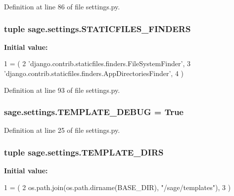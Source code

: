 Definition at line 86 of file settings.\+py.

\hypertarget{a00043_af629022b1da961fa9828f450bc80bd22}{}
\subsubsection[{S\+T\+A\+T\+I\+C\+F\+I\+L\+E\+S\+\_\+\+F\+I\+N\+D\+E\+R\+S}]{\setlength{\rightskip}{0pt plus 5cm}tuple sage.\+settings.\+S\+T\+A\+T\+I\+C\+F\+I\+L\+E\+S\+\_\+\+F\+I\+N\+D\+E\+R\+S}\label{a00043_af629022b1da961fa9828f450bc80bd22}
{\bfseries Initial value\+:}
\begin{DoxyCode}
1 = (
2     \textcolor{stringliteral}{'django.contrib.staticfiles.finders.FileSystemFinder'},
3     \textcolor{stringliteral}{'django.contrib.staticfiles.finders.AppDirectoriesFinder'},
4 )
\end{DoxyCode}


Definition at line 93 of file settings.\+py.

\hypertarget{a00043_a74c98bee40b9b06d51e44be6df73eb46}{}
\subsubsection[{T\+E\+M\+P\+L\+A\+T\+E\+\_\+\+D\+E\+B\+U\+G}]{\setlength{\rightskip}{0pt plus 5cm}sage.\+settings.\+T\+E\+M\+P\+L\+A\+T\+E\+\_\+\+D\+E\+B\+U\+G = True}\label{a00043_a74c98bee40b9b06d51e44be6df73eb46}


Definition at line 25 of file settings.\+py.

\hypertarget{a00043_addc90c15790d385d304972f1b3098a86}{}
\subsubsection[{T\+E\+M\+P\+L\+A\+T\+E\+\_\+\+D\+I\+R\+S}]{\setlength{\rightskip}{0pt plus 5cm}tuple sage.\+settings.\+T\+E\+M\+P\+L\+A\+T\+E\+\_\+\+D\+I\+R\+S}\label{a00043_addc90c15790d385d304972f1b3098a86}
{\bfseries Initial value\+:}
\begin{DoxyCode}
1 = (
2     os.path.join(os.path.dirname(BASE\_DIR), \textcolor{stringliteral}{"/sage/templates"}),
3 )
\end{DoxyCode}


